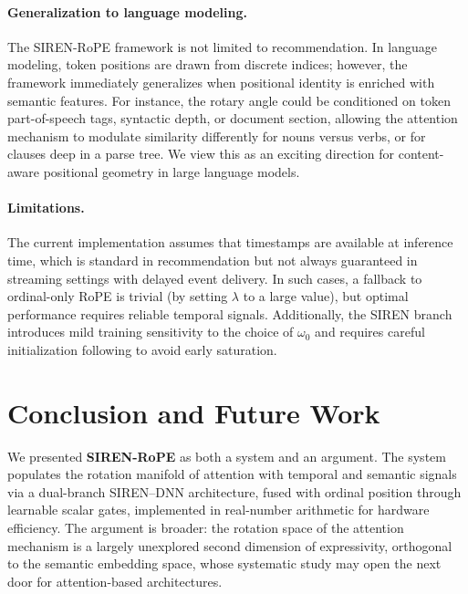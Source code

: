 \documentclass{article}
\begin{document}
\paragraph{Generalization to language modeling.}
The SIREN-RoPE framework is not limited to recommendation. In language
modeling, token positions are drawn from discrete indices; however, the
framework immediately generalizes when positional identity is enriched with
semantic features. For instance, the rotary angle could be conditioned on
token part-of-speech tags, syntactic depth, or document section, allowing the
attention mechanism to modulate similarity differently for nouns versus verbs,
or for clauses deep in a parse tree. We view this as an exciting direction for
content-aware positional geometry in large language models.

\paragraph{Limitations.}
The current implementation assumes that timestamps are available at inference
time, which is standard in recommendation but not always guaranteed in
streaming settings with delayed event delivery. In such cases, a fallback to
ordinal-only RoPE is trivial (by setting $\lambda$ to a large value), but
optimal performance requires reliable temporal signals. Additionally, the
SIREN branch introduces mild training sensitivity to the choice of $\omega_0$
and requires careful initialization following \citet{sitzmann2020siren} to
avoid early saturation.


\section{Conclusion and Future Work}
\label{sec:conclusion}

We presented \textbf{SIREN-RoPE} as both a system and an argument. The
system populates the rotation manifold of attention with temporal and semantic
signals via a dual-branch SIREN--DNN architecture, fused with ordinal
position through learnable scalar gates, implemented in real-number arithmetic
for hardware efficiency. The argument is broader: the rotation space of the
attention mechanism is a largely unexplored second dimension of expressivity,
orthogonal to the semantic embedding space, whose systematic study may open the
next door for attention-based architectures.
\end{document}
